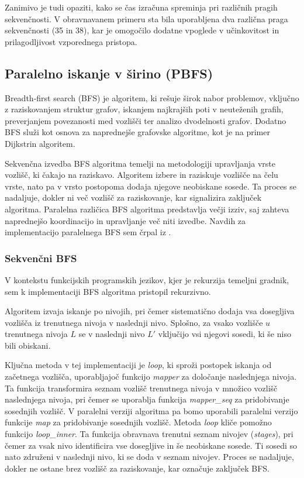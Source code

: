 \documentclass[mat1, tisk]{fmfdelo}
\begin{document}
Zanimivo je tudi opaziti, kako se čas izračuna spreminja pri različnih pragih sekvenčnosti. 
V obravnavanem primeru sta bila uporabljena dva različna praga sekvenčnosti (35 in 38), kar je omogočilo dodatne
vpoglede v učinkovitost in prilagodljivost vzporednega pristopa.

\subsection{Paralelno iskanje v širino (PBFS)}

Breadth-first search (BFS) je algoritem, ki rešuje širok nabor problemov, vključno z raziskovanjem struktur
grafov, iskanjem najkrajših poti v neuteženih grafih, preverjanjem povezanosti med vozlišči ter analizo dvodelnosti grafov.
Dodatno BFS služi kot osnova za naprednejše grafovske algoritme, kot je na primer Dijkstrin algoritem.

Sekvenčna izvedba BFS algoritma temelji na metodologiji upravljanja vrste vozlišč, ki čakajo na raziskavo.
Algoritem izbere in raziskuje vozlišče na čelu vrste, nato pa v vrsto postopoma dodaja njegove neobiskane sosede.
Ta proces se nadaljuje, dokler ni več vozlišč za raziskovanje, kar signalizira zaključek algoritma.
Paralelna različica BFS algoritma predstavlja večji izziv, saj zahteva naprednejšo koordinacijo in upravljanje več
niti izvedbe. Navdih za implementacijo paralelnega BFS sem črpal iz \cite{spaa2010}.

\subsubsection{Sekvenčni BFS}

V kontekstu funkcijskih programskih jezikov, kjer je rekurzija temeljni gradnik, sem k implementaciji BFS algoritma
pristopil rekurzivno. 

Algoritem izvaja iskanje po nivojih, pri čemer sistematično dodaja vsa dosegljiva vozlišča iz trenutnega nivoja v naslednji nivo.
Splošno, za vsako vozlišče $u$ trenutnega nivoja $L$ se v naslednji nivo $L'$ vključijo vsi njegovi sosedi, ki še niso
bili obiskani. 

Ključna metoda v tej implementaciji je \textit{loop}, ki sproži postopek iskanja od začetnega vozlišča, uporabljajoč funkcijo
\textit{mapper} za določanje naslednjega nivoja. Ta funkcija transformira seznam vozlišč trenutnega nivoja v množico
vozlišč naslednjega nivoja, pri čemer se uporablja funkcija \textit{mapper\_seq} za pridobivanje sosednjih vozlišč.
V paralelni verziji algoritma pa bomo uporabili paralelni verzijo funkcije \textit{map} za pridobivanje sosednjih vozlišč.
Metoda \textit{loop} kliče pomožno funkcijo \textit{loop\_inner}. Ta funkcija obravnava trenutni seznam
nivojev (\textit{stages}), pri čemer za vsak nivo identificira vse dosegljive in še neobiskane sosede.
Ti sosedi so nato združeni v naslednji nivo, ki se doda v seznam nivojev. Proces se nadaljuje, dokler ne ostane brez
vozlišč za raziskovanje, kar označuje zaključek BFS.
\end{document}
